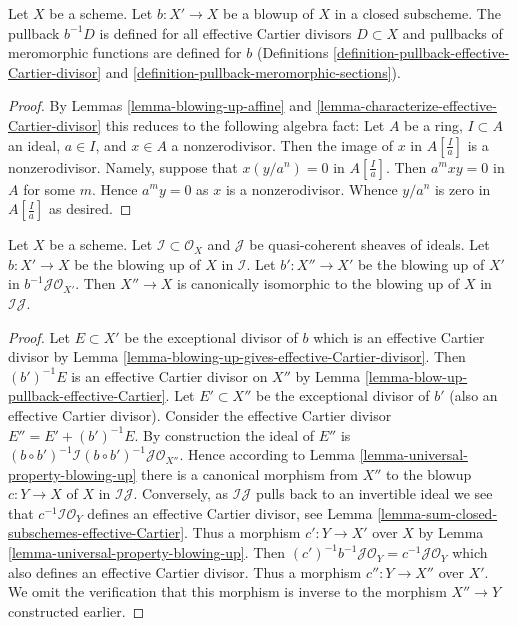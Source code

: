 \begin{lemma}
\label{lemma-blow-up-pullback-effective-Cartier}
Let $X$ be a scheme. Let $b : X' \to X$ be a blowup of $X$ in a closed
subscheme. The pullback $b^{-1}D$ is defined
for all effective Cartier divisors $D \subset X$
and pullbacks of meromorphic functions are defined for $b$
(Definitions
\ref{definition-pullback-effective-Cartier-divisor} and
\ref{definition-pullback-meromorphic-sections}).
\end{lemma}

\begin{proof}
By Lemmas \ref{lemma-blowing-up-affine} and
\ref{lemma-characterize-effective-Cartier-divisor}
this reduces to the following algebra fact:
Let $A$ be a ring, $I \subset A$ an ideal, $a \in I$, and $x \in A$
a nonzerodivisor. Then the image of $x$ in $A[\frac{I}{a}]$ is a
nonzerodivisor. Namely, suppose that $x (y/a^n) = 0$ in $A[\frac{I}{a}]$.
Then $a^mxy = 0$ in $A$ for some $m$. Hence $a^my = 0$ as $x$ is a
nonzerodivisor. Whence $y/a^n$ is zero in $A[\frac{I}{a}]$ as desired.
\end{proof}

\begin{lemma}
\label{lemma-blowing-up-two-ideals}
Let $X$ be a scheme. Let $\mathcal{I} \subset \mathcal{O}_X$ and
$\mathcal{J}$ be quasi-coherent sheaves of ideals. Let $b : X' \to X$
be the blowing up of $X$ in $\mathcal{I}$. Let $b' : X'' \to X'$ be the
blowing up of $X'$ in $b^{-1}\mathcal{J} \mathcal{O}_{X'}$. Then $X'' \to X$
is canonically isomorphic to the blowing up of $X$ in $\mathcal{I}\mathcal{J}$.
\end{lemma}

\begin{proof}
Let $E \subset X'$ be the exceptional divisor of $b$ which is an effective
Cartier divisor by
Lemma \ref{lemma-blowing-up-gives-effective-Cartier-divisor}.
Then $(b')^{-1}E$ is an effective Cartier divisor on $X''$ by
Lemma \ref{lemma-blow-up-pullback-effective-Cartier}.
Let $E' \subset X''$ be the exceptional divisor of $b'$ (also an effective
Cartier divisor). Consider the effective Cartier divisor
$E'' = E' + (b')^{-1}E$. By construction the ideal of $E''$ is
$(b \circ b')^{-1}\mathcal{I} (b \circ b')^{-1}\mathcal{J} \mathcal{O}_{X''}$.
Hence according to Lemma \ref{lemma-universal-property-blowing-up}
there is a canonical morphism from $X''$ to the blowup $c : Y \to X$
of $X$ in $\mathcal{I}\mathcal{J}$. Conversely, as $\mathcal{I}\mathcal{J}$
pulls back to an invertible ideal we see that
$c^{-1}\mathcal{I}\mathcal{O}_Y$ defines
an effective Cartier divisor, see
Lemma \ref{lemma-sum-closed-subschemes-effective-Cartier}.
Thus a morphism $c' : Y \to X'$ over $X$ by
Lemma \ref{lemma-universal-property-blowing-up}.
Then $(c')^{-1}b^{-1}\mathcal{J}\mathcal{O}_Y = c^{-1}\mathcal{J}\mathcal{O}_Y$
which also defines an effective Cartier divisor. Thus a morphism
$c'' : Y \to X''$ over $X'$. We omit the verification that this
morphism is inverse to the morphism $X'' \to Y$ constructed earlier.
\end{proof}

